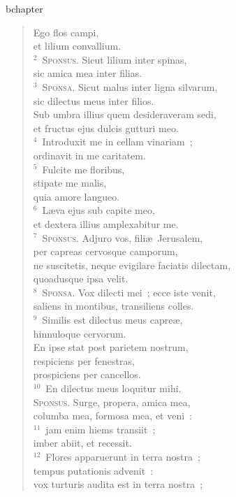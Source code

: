bchapter\begin{verse}\vspace{-19pt}Ego flos campi,\\ et lilium convallium.\\
${}^{2}$~\textsc{Sponsus.} Sicut lilium inter spinas,\\ sic amica mea inter filias.\\
${}^{3}$~\textsc{Sponsa.} Sicut malus inter ligna silvarum,\\ sic dilectus meus inter filios.\\ Sub umbra illius quem desideraveram sedi,\\ et fructus ejus dulcis gutturi meo.\\
${}^{4}$~Introduxit me in cellam vinariam~;\\ ordinavit in me caritatem.\\
${}^{5}$~Fulcite me floribus,\\ stipate me malis,\\ quia amore langueo.\\
${}^{6}$~L\ae va ejus sub capite meo,\\ et dextera illius amplexabitur me.\\
${}^{7}$~\textsc{Sponsus.} Adjuro vos, fili\ae\ Jerusalem,\\ per capreas cervosque camporum,\\ ne suscitetis, neque evigilare faciatis dilectam,\\ quoadusque ipsa velit.\\
${}^{8}$~\textsc{Sponsa.} Vox dilecti mei~; ecce iste venit,\\ saliens in montibus, transiliens colles.\\
${}^{9}$~Similis est dilectus meus capre\ae ,\\ hinnuloque cervorum.\\ En ipse stat post parietem nostrum,\\ respiciens per fenestras,\\ prospiciens per cancellos.\\
${}^{10}$~En dilectus meus loquitur mihi.\\ \textsc{Sponsus.} Surge, propera, amica mea,\\ columba mea, formosa mea, et veni~:\\
${}^{11}$~jam enim hiems transiit~;\\ imber abiit, et recessit.\\
${}^{12}$~Flores apparuerunt in terra nostra~;\\ tempus putationis advenit~:\\ vox turturis audita est in terra nostra~;\\

\end{verse}

